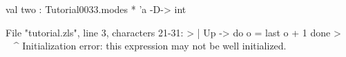 \chklistingfalse
{}
\begin{ChkListingMsg}
val two : Tutorial0033.modes * 'a -D-> int
\end{ChkListingMsg}
\begin{ChkListingErr}
File "tutorial.zls", line 3, characters 21-31:
>      | Up -> do o = last o + 1 done
>                     ^^^^^^^^^^
Initialization error: this expression may not be well initialized.
\end{ChkListingErr}
